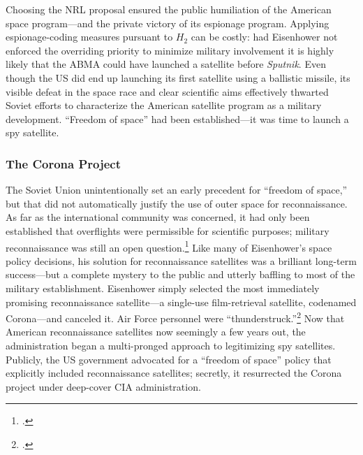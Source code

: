 \documentclass[14pt]{extarticle}
\begin{document}
Choosing the NRL proposal ensured the public humiliation of the American space program---and the private victory of its espionage program. Applying espionage-coding measures pursuant to $H_2$ can be costly: had Eisenhower not enforced the overriding priority to minimize military involvement it is highly likely that the ABMA could have launched a satellite before \emph{Sputnik}. Even though the US did end up launching its first satellite using a ballistic missile, its visible defeat in the space race and clear scientific aims effectively thwarted Soviet efforts to characterize the American satellite program as a military development. \enquote{Freedom of space} had been established---it was time to launch a spy satellite.

\subsubsection{The Corona Project}


The Soviet Union unintentionally set an early precedent for ``freedom of space,'' but that did not automatically justify the use of outer space for reconnaissance. As far as the international community was concerned, it had only been established that overflights were permissible for scientific purposes; military reconnaissance was still an open question.\footcite[p.~47-48]{peebles_corona_1997} Like many of Eisenhower's space policy decisions, his solution for reconnaissance satellites was a brilliant long-term success---but a complete mystery to the public and utterly baffling to most of the military establishment. Eisenhower simply selected the most immediately promising reconnaissance satellite---a single-use film-retrieval satellite, codenamed Corona---and canceled it. Air Force personnel were ``thunderstruck.''\footcite[p.~45]{peebles_corona_1997} Now that American reconnaissance satellites now seemingly a few years out, the administration began a multi-pronged approach to legitimizing spy satellites. Publicly, the US government advocated for a ``freedom of space'' policy that explicitly included reconnaissance satellites; secretly, it resurrected the Corona project under deep-cover CIA administration.
\end{document}
